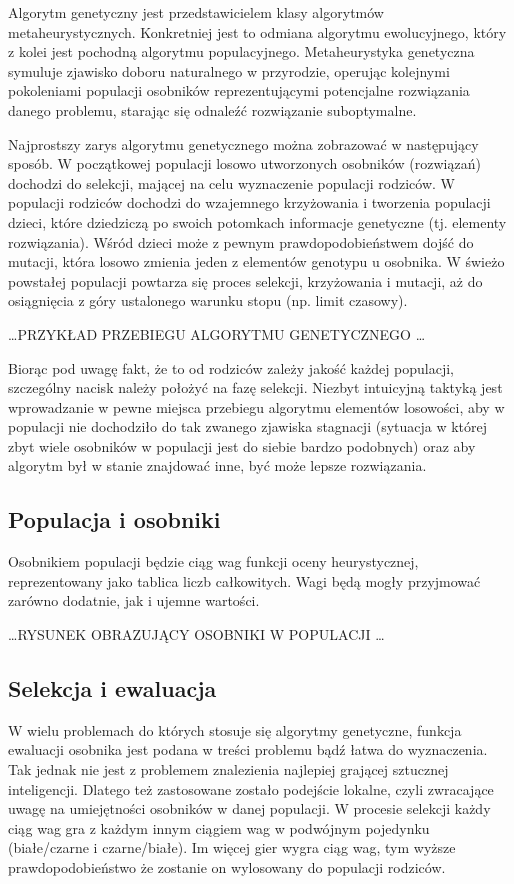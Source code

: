 Algorytm genetyczny jest przedstawicielem klasy algorytmów metaheurystycznych. Konkretniej jest to odmiana algorytmu ewolucyjnego, który z kolei jest pochodną algorytmu populacyjnego. Metaheurystyka genetyczna symuluje zjawisko doboru naturalnego w przyrodzie, operując kolejnymi pokoleniami populacji osobników reprezentującymi potencjalne rozwiązania danego problemu, starając się odnaleźć rozwiązanie suboptymalne.

Najprostszy zarys algorytmu genetycznego można zobrazować w następujący sposób. W początkowej populacji losowo utworzonych osobników (rozwiązań) dochodzi do selekcji, mającej na celu wyznaczenie populacji rodziców. W populacji rodziców dochodzi do wzajemnego krzyżowania i tworzenia populacji dzieci, które dziedziczą po swoich potomkach informacje genetyczne (tj. elementy rozwiązania). Wśród dzieci może z pewnym prawdopodobieństwem dojść do mutacji, która losowo zmienia jeden z elementów genotypu u osobnika. W świeżo powstałej populacji powtarza się proces selekcji, krzyżowania i mutacji, aż do osiągnięcia z góry ustalonego warunku stopu (np. limit czasowy).

\ldots PRZYKŁAD PRZEBIEGU ALGORYTMU GENETYCZNEGO \ldots

Biorąc pod uwagę fakt, że to od rodziców zależy jakość każdej populacji, szczególny nacisk należy położyć na fazę selekcji. Niezbyt intuicyjną taktyką jest wprowadzanie w pewne miejsca przebiegu algorytmu elementów losowości, aby w populacji nie dochodziło do tak zwanego zjawiska stagnacji (sytuacja w której zbyt wiele osobników w populacji jest do siebie bardzo podobnych) oraz aby algorytm był w stanie znajdować inne, być może lepsze rozwiązania.

\subsection{Populacja i osobniki}

Osobnikiem populacji będzie ciąg wag funkcji oceny heurystycznej, reprezentowany jako tablica liczb całkowitych. Wagi będą mogły przyjmować zarówno dodatnie, jak i ujemne wartości.

\ldots RYSUNEK OBRAZUJĄCY OSOBNIKI W POPULACJI \ldots

\subsection{Selekcja i ewaluacja}

W wielu problemach do których stosuje się algorytmy genetyczne, funkcja ewaluacji osobnika jest podana w treści problemu bądź łatwa do wyznaczenia. Tak jednak nie jest z problemem znalezienia najlepiej grającej sztucznej inteligencji. Dlatego też zastosowane zostało podejście lokalne, czyli zwracające uwagę na umiejętności osobników w danej populacji. W procesie selekcji każdy ciąg wag gra z każdym innym ciągiem wag w podwójnym pojedynku (białe/czarne i czarne/białe). Im więcej gier wygra ciąg wag, tym wyższe prawdopodobieństwo że zostanie on wylosowany do populacji rodziców.

